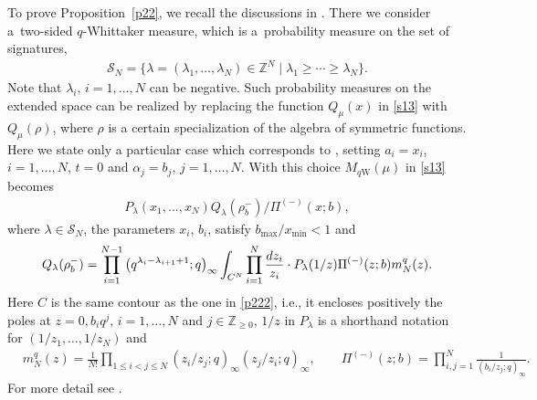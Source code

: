 \documentclass[11pt]{article}
\numberwithin{equation}{section}
\numberwithin{equation}{section}
\def\a{\alpha}
\def\l{\lambda}
\def\S{\mathcal{S}}
\def\Z{\mathbb{Z}}
\begin{document}
To prove Proposition~\ref{p22}, we recall the discussions in \cite[Section 3]{ImamuraSasamoto2019qTASEPtheta}. There we consider a~two-sided $q$-Whittaker measure, which is a~probability measure on the set of signatures,
\begin{align*}
 \S_N=\big\{\l=(\l_1,\dots,\l_N)\in \Z^N\mid \l_1\ge\cdots\ge \l_N\big\}.
\end{align*}
Note that $\l_i$, $i=1,\dots,N$ can be negative. Such probability measures on the extended space can be realized by replacing the function $Q_{\mu}(x)$ in \eqref{s13} with $Q_{\mu}(\rho)$, where $\rho$ is a certain specialization of the algebra of symmetric functions.
Here we state only a particular case which corresponds to \cite[Definition 3.4]{ImamuraSasamoto2019qTASEPtheta}, setting $a_i=x_i$, $i=1,\dots,N$, $t=0$ and $\a_j=b_j$, $j=1,\dots,N$. With this choice $M_{q\text{W}}(\mu)$ in \eqref{s13} becomes
\begin{align}
\label{p224}
P_{\l}(x_1,\dots,x_N)Q_{\l}(\rho^{-}_b)/\Pi^{(-)}(x;b),
\end{align}
where $\l\in\S_N$, the parameters $x_i$, $b_i$,
satisfy $b_{\max}/x_{\min}<1$ and
\begin{align}
Q_\l(\rho^-_b)
 =\prod_{i=1}^{N-1}\big(q^{\l_i-\l_{i+1}+1};q\big)_{\infty}
\int_{C^N}\prod_{i=1}^N\frac{{\rm d}z_i}{z_i}\cdot
P_\l (1/z)
 \Pi^{(-)}(z;b)m_N^q(z).
\label{defQ}
\end{align}
Here $C$ is the same contour as the
one in \eqref{p222}, i.e., it encloses
positively
the poles at $z=0, b_iq^j$, $i=1,\dots,N$
and $j\in\Z_{\ge 0}$, $1/z$ in $P_\l$ is a shorthand notation for
$(1/z_1,\dots,1/z_N)$ and
\begin{align*}%
&m_N^q(z)=\frac{1}{N!}\prod_{1\le i<j\le N}(z_i/z_j;q)_{\infty}(z_j/z_i;q)_{\infty},
\qquad
\Pi^{(-)}(z;b)=\prod_{i,j=1}^N\frac{1}{(b_i/z_j;q)_{\infty}}.
\end{align*}
For more detail see \cite[Appendix B]{ImamuraSasamoto2019qTASEPtheta}.
\end{document}
